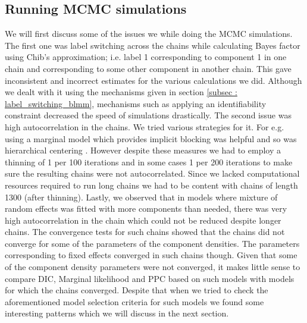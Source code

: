 \subsection{Running MCMC simulations}
We will first discuss some of the issues we while doing the MCMC simulations. The first one was label switching across the chains while calculating Bayes factor using Chib's approximation; i.e. label 1 corresponding to component 1 in one chain and corresponding to some other component in another chain. This gave inconsistent and incorrect estimates for the various calculations we did. Although we dealt with it using the mechanisms given in section \ref{subsec : label_switching_blmm}, mechanisms such as applying an identifiability constraint decreased the speed of simulations drastically. The second issue was high autocorrelation in the chains. We tried various strategies for it. For e.g. using a marginal model which provides implicit blocking was helpful and so was hierarchical centering
\captionsetup{justification=centering}. However despite these measures we had to employ a thinning of 1 per 100 iterations and in some cases 1 per 200 iterations to make sure the resulting chains were not autocorrelated. Since we lacked computational resources required to run long chains we had to be content with chains of length 1300 (after thinning). Lastly, we observed that in models where mixture of random effects was fitted with more components than needed, there was very high autocorrelation in the chain which could not be reduced despite longer chains. The convergence tests for such chains showed that the chains did not converge for some of the parameters of the component densities. The parameters corresponding to fixed effects converged in such chains though. Given that some of the component density parameters were not converged, it makes little sense to compare DIC, Marginal likelihood and PPC based on such models with models for which the chains converged. Despite that when we tried to check the aforementioned model selection criteria for such models we found some interesting patterns which we will discuss in the next section.

